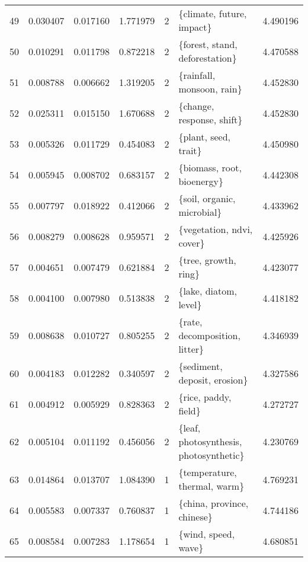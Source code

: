 \begin{tabular}{lrrrrlr}
49 &    0.030407 &  0.017160 &        1.771979 &           2 &               \{climate, future, impact\} &  4.490196 \\
50 &    0.010291 &  0.011798 &        0.872218 &           2 &          \{forest, stand, deforestation\} &  4.470588 \\
51 &    0.008788 &  0.006662 &        1.319205 &           2 &               \{rainfall, monsoon, rain\} &  4.452830 \\
52 &    0.025311 &  0.015150 &        1.670688 &           2 &               \{change, response, shift\} &  4.452830 \\
53 &    0.005326 &  0.011729 &        0.454083 &           2 &                    \{plant, seed, trait\} &  4.450980 \\
54 &    0.005945 &  0.008702 &        0.683157 &           2 &              \{biomass, root, bioenergy\} &  4.442308 \\
55 &    0.007797 &  0.018922 &        0.412066 &           2 &              \{soil, organic, microbial\} &  4.433962 \\
56 &    0.008279 &  0.008628 &        0.959571 &           2 &               \{vegetation, ndvi, cover\} &  4.425926 \\
57 &    0.004651 &  0.007479 &        0.621884 &           2 &                    \{tree, growth, ring\} &  4.423077 \\
58 &    0.004100 &  0.007980 &        0.513838 &           2 &                   \{lake, diatom, level\} &  4.418182 \\
59 &    0.008638 &  0.010727 &        0.805255 &           2 &           \{rate, decomposition, litter\} &  4.346939 \\
60 &    0.004183 &  0.012282 &        0.340597 &           2 &            \{sediment, deposit, erosion\} &  4.327586 \\
61 &    0.004912 &  0.005929 &        0.828363 &           2 &                    \{rice, paddy, field\} &  4.272727 \\
62 &    0.005104 &  0.011192 &        0.456056 &           2 &  \{leaf, photosynthesis, photosynthetic\} &  4.230769 \\
63 &    0.014864 &  0.013707 &        1.084390 &           1 &            \{temperature, thermal, warm\} &  4.769231 \\
64 &    0.005583 &  0.007337 &        0.760837 &           1 &              \{china, province, chinese\} &  4.744186 \\
65 &    0.008584 &  0.007283 &        1.178654 &           1 &                     \{wind, speed, wave\} &  4.680851 \\

\end{tabular}
